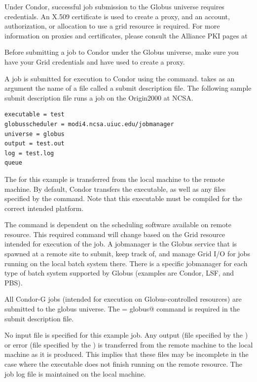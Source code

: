 Under Condor, successful job submission to the Globus universe requires
credentials.
An X.509 certificate is used to create a proxy,
and an account, authorization, or allocation to use a grid resource
is required.
For more information on proxies and certificates,
please consult the Alliance PKI pages at 


Before submitting a job to Condor under the Globus universe,
make sure you have your Grid 
credentials and have used  to create a proxy.

A job is submitted for execution to Condor using the
 command.
 takes as an argument
the name of a file called a submit description file.
The following sample submit description file runs a job on
the Origin2000 at NCSA.

\begin{verbatim}
executable = test
globusscheduler = modi4.ncsa.uiuc.edu/jobmanager
universe = globus
output = test.out
log = test.log
queue
\end{verbatim} 

The 
for this example is
transferred from the local machine to the remote machine.
By default, Condor transfers the executable, as well as any
files specified by the  command.
Note that this executable must be compiled for the correct
intended platform.

The  command is dependent on the
scheduling software available on remote resource.
This required command will change based on the Grid resource
intended for execution of the job.
A jobmanager is the Globus service that is spawned at a remote site to
submit, keep track of, and manage Grid I/O for jobs running on the local
batch system there.
There is a specific jobmanager for each type of
batch system supported by Globus (examples are Condor, LSF, and PBS).

All Condor-G jobs (intended for execution on Globus-controlled
resources) are submitted to the globus universe.
The \verb@universe = globus@ command is required
in the submit description file.

No input file is specified for this example job.
Any output (file specified by the )
or error (file specified by the )
is transferred 
from the remote machine to the local machine as it is produced.
This implies that these files may be incomplete in the case
where the executable does not finish running on the remote resource.
The job log file is maintained on the local machine.

